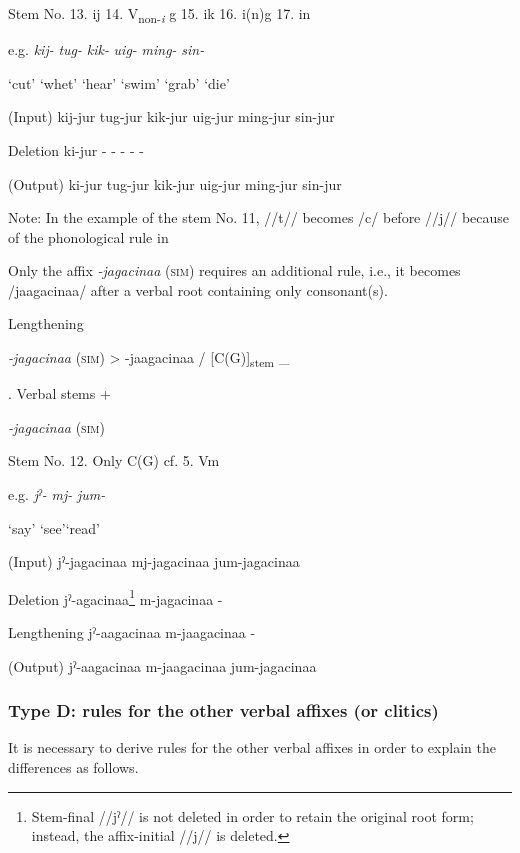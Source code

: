 \begin{table}
Stem No.  13. ij  14. V\textsubscript{non-}\textit{\textsubscript{i}} g  15. ik  16. i(n)g    17. in

e.g.  \textit{kij-}  \textit{tug-}  \textit{kik-}  \textit{uig-}  \textit{ming-}  \textit{sin-}

  ‘cut’  ‘whet’  ‘hear’  ‘swim’  ‘grab’  ‘die’

(Input)  kij-jur  tug-jur  kik-jur  uig-jur  ming-jur  sin-jur

Deletion  ki-jur  -  -  -  -  -

(Output)  ki-jur  tug-jur  kik-jur  uig-jur  ming-jur  sin-jur

Note: In the example of the stem No. 11, //t// becomes /c/ before //j// because of the phonological rule in 
\end{table}

Only the affix \textit{-jagacinaa} (\textsc{sim}) requires an additional rule, i.e., it becomes /jaagacinaa/ after a verbal root containing only consonant(s).

\ea\label{ex:8-15}
  Lengthening

  \textit{-jagacinaa} (\textsc{sim})  >  -jaagacinaa  /  [C(G)]\textsubscript{stem}  \_
\z

\begin{table}
\caption{\label{tab:key:63}. Verbal stems +} \textmd{\textit{-jagacinaa}}\textmd{ (\textsc{sim})}

Stem No.  12. Only C(G)    cf.  5. Vm

e.g.  \textit{jˀ-}  \textit{mj-}      \textit{jum-}

  ‘say’  ‘see’\glt ‘read’

(Input)  jˀ-jagacinaa  mj-jagacinaa      jum-jagacinaa

Deletion  jˀ-agacinaa\footnote{Stem-final //jˀ// is not deleted in order to retain the original root form; instead, the affix-initial //j// is deleted.}  m-jagacinaa      -

Lengthening  jˀ-aagacinaa  m-jaagacinaa      -

(Output)  jˀ-aagacinaa  m-jaagacinaa      jum-jagacinaa
\end{table}

\subsubsection{Type D: rules for the other verbal affixes (or clitics)}
\label{bkm:Ref347177096}
It is necessary to derive rules for the other verbal affixes in order to explain the differences as follows.

